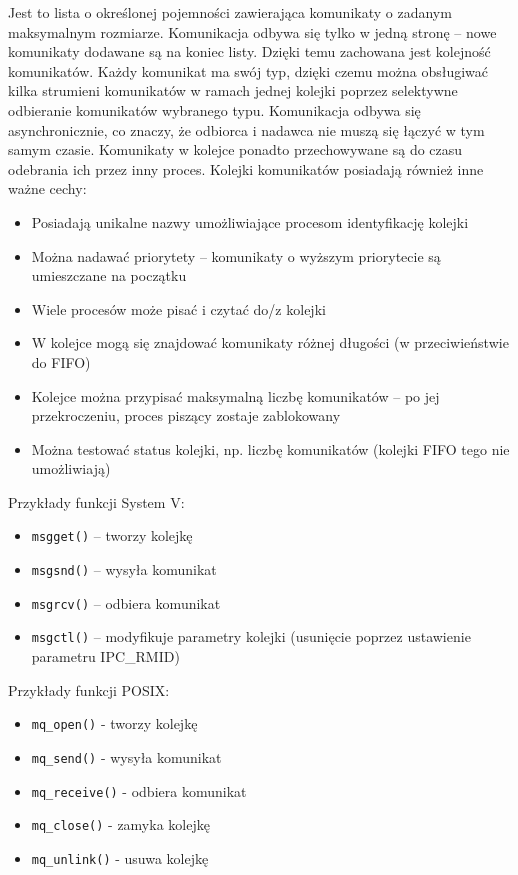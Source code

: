 Jest to lista o określonej pojemności zawierająca komunikaty o zadanym maksymalnym rozmiarze. Komunikacja odbywa się tylko w jedną stronę -- nowe komunikaty dodawane są na koniec listy. Dzięki temu zachowana jest kolejność komunikatów. Każdy komunikat ma swój typ, dzięki czemu można obsługiwać kilka strumieni komunikatów w ramach jednej kolejki poprzez selektywne odbieranie komunikatów wybranego typu. Komunikacja odbywa się asynchronicznie, co znaczy, że odbiorca i nadawca nie muszą się łączyć w tym samym czasie. Komunikaty w kolejce ponadto przechowywane są do czasu odebrania ich przez inny proces. Kolejki komunikatów posiadają również inne ważne cechy:
\begin{itemize}
	\item Posiadają unikalne nazwy umożliwiające procesom identyfikację kolejki
    \item Można nadawać priorytety -- komunikaty o wyższym priorytecie są umieszczane na początku
    \item Wiele procesów może pisać i czytać do/z kolejki
    \item W kolejce mogą się znajdować komunikaty różnej długości (w przeciwieństwie do FIFO)
    \item Kolejce można przypisać maksymalną liczbę komunikatów -- po jej przekroczeniu, proces piszący zostaje zablokowany
    \item Można testować status kolejki, np. liczbę komunikatów (kolejki FIFO tego nie umożliwiają)
\end{itemize}

Przykłady funkcji System V:
\begin{itemize}
	\item \texttt{msgget()} -- tworzy kolejkę
    \item \texttt{msgsnd()} -- wysyła komunikat
    \item \texttt{msgrcv()} -- odbiera komunikat
    \item \texttt{msgctl()} -- modyfikuje parametry kolejki (usunięcie poprzez ustawienie parametru IPC\_RMID)
\end{itemize}

Przykłady funkcji POSIX:
\begin{itemize}
	\item \texttt{mq\_open()} - tworzy kolejkę
    \item \texttt{mq\_send()} - wysyła komunikat
    \item \texttt{mq\_receive()} - odbiera komunikat
    \item \texttt{mq\_close()} - zamyka kolejkę
    \item \texttt{mq\_unlink()} - usuwa kolejkę
\end{itemize}

